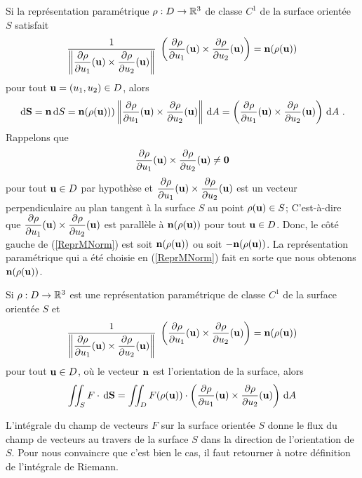 {Si la représentation paramétrique $\rho:D\rightarrow \mathbb{R}^3$
de classe $C^1$ de la surface orientée $S$ satisfait
\begin{equation}\label{ReprMNorm}
\frac{1}{\displaystyle \left\| \frac{\partial \rho}{\partial u_1}(\mathbf{u}) \times
\frac{\partial \rho}{\partial u_2}(\mathbf{u})\right\|} \;
\left( \frac{\partial \rho}{\partial u_1}(\mathbf{u}) \times \frac{\partial \rho}{\partial u_2}(\mathbf{u}) \right)
= \mathbf{n}(\rho(\mathbf{u}))
\end{equation}
pour tout $\mathbf{u} = (u_1,u_2) \in D$, alors
\[
\,\mathrm{d}\mathbf{S} = \mathbf{n} \,\mathrm{d}S 
= \mathbf{n}(\rho(\mathbf{u}))) 
\left\| \frac{\partial \rho}{\partial u_1}(\mathbf{u}) \times
\frac{\partial \rho}{\partial u_2}(\mathbf{u})\right\| \,\mathrm{d}A
= \left( \frac{\partial \rho}{\partial u_1}(\mathbf{u}) \times
\frac{\partial \rho}{\partial u_2}(\mathbf{u})\right) \,\mathrm{d}A \ .
\]
Rappelons que
\[
\frac{\partial \rho}{\partial u_1}(\mathbf{u}) \times \frac{\partial \rho}{\partial u_2}(\mathbf{u}) \neq \mathbf{0}
\]
pour tout $\mathbf{u} \in D$ par hypothèse et
$\displaystyle \frac{\partial \rho}{\partial u_1}(\mathbf{u}) \times \frac{\partial \rho}{\partial u_2}(\mathbf{u})$
est un vecteur perpendiculaire au plan tangent à la surface
$S$ au point $\rho(\mathbf{u}) \in S$;
C'est-à-dire que 
$\displaystyle \frac{\partial \rho}{\partial u_1}(\mathbf{u}) \times \frac{\partial \rho}{\partial u_2}(\mathbf{u})$
est parallèle à $\mathbf{n}(\rho(\mathbf{u}))$ pour tout
$\mathbf{u} \in D$.  Donc, le côté gauche de (\ref{ReprMNorm}) est soit
$\mathbf{n}(\rho(\mathbf{u}))$ ou soit $-\mathbf{n}(\rho(\mathbf{u}))$.
La représentation paramétrique qui a été choisie en (\ref{ReprMNorm})
fait en sorte que nous obtenons $\mathbf{n}(\rho(\mathbf{u}))$.

\begin{focus}{\prp}
Si $\rho:D\rightarrow \mathbb{R}^3$ est une représentation paramétrique de classe
$C^1$ de la surface orientée $S$ et
\[
\frac{1}{\displaystyle \left\| \frac{\partial \rho}{\partial u_1}(\mathbf{u}) \times
\frac{\partial \rho}{\partial u_2}(\mathbf{u})\right\|} \;
\left( \frac{\partial \rho}{\partial u_1}(\mathbf{u}) \times \frac{\partial \rho}{\partial u_2}(\mathbf{u}) \right)
= \mathbf{n}(\rho(\mathbf{u}))
\]
pour tout $\mathbf{u} \in D$, où le vecteur $\mathbf{n}$ est l'orientation de
la surface, alors
\begin{equation} \label{formula}
\iint_S F \cdot \,\mathrm{d}\mathbf{S}
= \iint_D F(\rho(\mathbf{u})) \cdot \left(\frac{\partial \rho}{\partial u_1}(\mathbf{u})
\times \frac{\partial \rho}{\partial u_2}(\mathbf{u})\right) \,\mathrm{d}A
\end{equation}
\end{focus}

\begin{rmk}
L'intégrale du champ de vecteurs $F$ sur la surface orientée $S$
donne le flux du champ de vecteurs au travers de la surface $S$ dans
la direction de l'orientation de $S$.  Pour nous convaincre que c'est
bien le cas, il faut retourner à notre définition de l'intégrale de
Riemann.


\end{rmk}}
